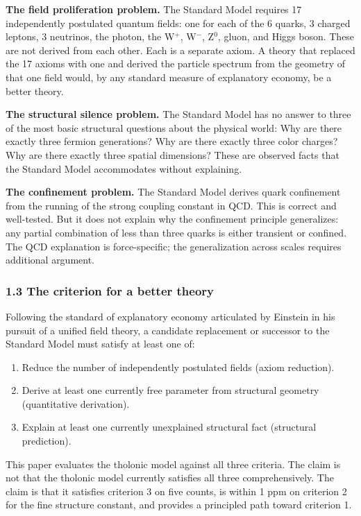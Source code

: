 \documentclass[
  11pt,
  letterpaper,
]{article}
\providecommand{\tightlist}{%
  \setlength{\itemsep}{0pt}\setlength{\parskip}{0pt}}
\begin{document}
\textbf{The field proliferation problem.} The Standard Model requires 17
independently postulated quantum fields: one for each of the 6 quarks, 3
charged leptons, 3 neutrinos, the photon, the W\(^+\), W\(^-\), Z\(^0\),
gluon, and Higgs boson. These are not derived from each other. Each is a
separate axiom. A theory that replaced the 17 axioms with one and
derived the particle spectrum from the geometry of that one field would,
by any standard measure of explanatory economy, be a better theory.

\textbf{The structural silence problem.} The Standard Model has no
answer to three of the most basic structural questions about the
physical world: Why are there exactly three fermion generations? Why are
there exactly three color charges? Why are there exactly three spatial
dimensions? These are observed facts that the Standard Model
accommodates without explaining.

\textbf{The confinement problem.} The Standard Model derives quark
confinement from the running of the strong coupling constant in QCD.
This is correct and well-tested. But it does not explain why the
confinement principle generalizes: any partial combination of less than
three quarks is either transient or confined. The QCD explanation is
force-specific; the generalization across scales requires additional
argument.

\subsubsection{1.3 The criterion for a better
theory}\label{the-criterion-for-a-better-theory}

Following the standard of explanatory economy articulated by Einstein in
his pursuit of a unified field theory, a candidate replacement or
successor to the Standard Model must satisfy at least one of:

\begin{enumerate}
\def\labelenumi{\arabic{enumi}.}
\tightlist
\item
  Reduce the number of independently postulated fields (axiom
  reduction).
\item
  Derive at least one currently free parameter from structural geometry
  (quantitative derivation).
\item
  Explain at least one currently unexplained structural fact (structural
  prediction).
\end{enumerate}

This paper evaluates the tholonic model against all three criteria. The
claim is not that the tholonic model currently satisfies all three
comprehensively. The claim is that it satisfies criterion 3 on five
counts, is within 1 ppm on criterion 2 for the fine structure constant,
and provides a principled path toward criterion 1.
\end{document}
